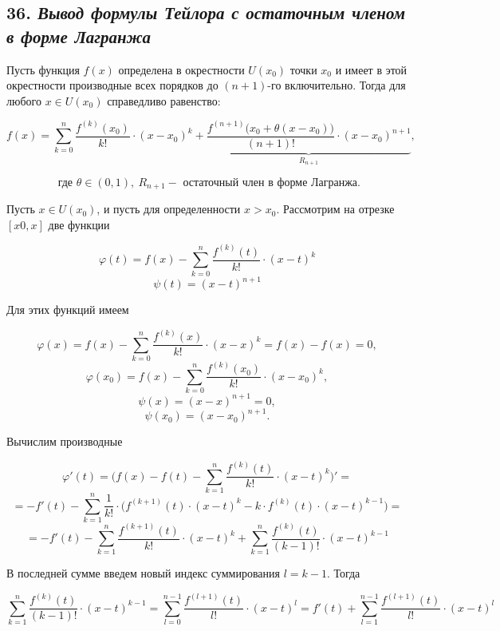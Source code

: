 \subsection*{36. \textit{Вывод формулы Тейлора с остаточным членом в форме Лагранжа}}

Пусть функция $f(x)$ определена в окрестности $U(x_0)$ точки $x_0$ и имеет в этой окрестности производные всех порядков до $(n + 1)$-го включительно. Тогда для любого $x \in U(x_0)$ справедливо равенство:
\begin{mainQuote}

$$ f(x) = \sum\limits_{k=0}^n\dfrac{f^{(k)}(x_0)}{k!}\cdot (x - x_0)^k + \underbrace{\dfrac{f^{(n+1)}\big(x_0 + \theta(x - x_0)\big)}{(n+1)!}\cdot (x - x_0)^{n + 1}}_{ R_{n+1}},  $$

$$ \text{ где } \theta \in (0, 1), \ R_{n+1} - \text{ остаточный член в форме Лагранжа}. $$
\end{mainQuote}

Пусть $x \in U(x_0)$, и пусть для определенности $x > x_0$. Рассмотрим на отрезке $[x0, x]$ две функции

$$
\varphi(t) = f(x) - \sum\limits_{k=0}^n\dfrac{f^{(k)}(t)}{k!}\cdot (x - t)^k
$$ $$
\psi(t) = (x - t)^{n+1}
$$

Для этих функций имеем

$$
\varphi(x) = f(x) - \sum\limits_{k=0}^n\dfrac{f^{(k)}(x)}{k!}\cdot (x - x)^k = f(x) - f(x) = 0, 
$$ $$
\varphi(x_0) = f(x) - \sum\limits_{k=0}^n\dfrac{f^{(k)}(x_0)}{k!}\cdot (x -  x_0)^k,
$$ $$\psi(x) = (x - x)^{n+1} = 0,$$ $$\psi(x_0) = (x - x_0)^{n+1}.$$

Вычислим производные

$$
\varphi'(t) = \bigg(f(x) - f(t) - \sum\limits_{k=1}^n\dfrac{f^{(k)}(t)}{k!}\cdot (x - t)^k\bigg)' = $$ $$=-f'(t) - \sum\limits_{k=1}^n \dfrac{1}{k!}\cdot\bigg(f^{(k+1)}(t) \cdot (x - t)^k - k\cdot f^{(k)}(t)\cdot(x - t)^{k-1}\bigg) =
$$ $$
= -f'(t) - \sum\limits_{k=1}^n \dfrac{f^{(k+1)}(t) }{k!}\cdot (x - t)^k + \sum\limits_{k=1}^n\dfrac{f^{(k)}(t)}{(k - 1)!}\cdot(x - t)^{k-1}  
$$

В последней сумме введем новый индекс суммирования $l = k - 1$. Тогда

$$
\sum\limits_{k=1}^n\dfrac{f^{(k)}(t)}{(k - 1)!}\cdot(x - t)^{k-1} = \sum\limits_{l=0}^{n-1}\dfrac{f^{(l+1)}(t)}{l!}\cdot(x - t)^{l}= f'(t)+ \sum\limits_{l=1}^{n-1}\dfrac{f^{(l+1)}(t)}{l!}\cdot(x - t)^{l}
$$

